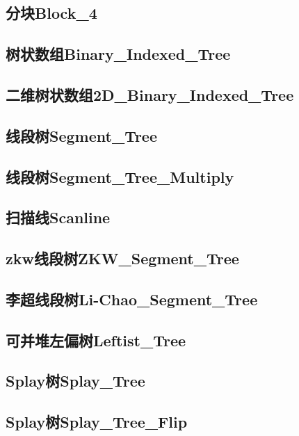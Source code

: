 \documentclass[10pt,a4paper]{article}
\begin{document}
\subsection{分块Block\_4}

\subsection{树状数组Binary\_Indexed\_Tree}

\subsection{二维树状数组2D\_Binary\_Indexed\_Tree}

\subsection{线段树Segment\_Tree}

\subsection{线段树Segment\_Tree\_Multiply}

\subsection{扫描线Scanline}

\subsection{zkw线段树ZKW\_Segment\_Tree}

\subsection{李超线段树Li-Chao\_Segment\_Tree}

\subsection{可并堆左偏树Leftist\_Tree}

\subsection{Splay树Splay\_Tree}

\subsection{Splay树Splay\_Tree\_Flip}

\end{document}
